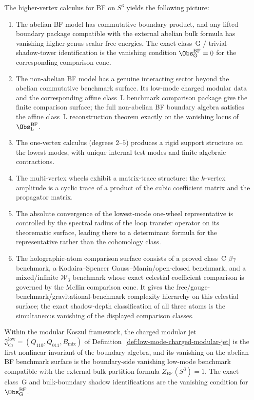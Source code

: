\begin{remark}
The higher-vertex calculus for BF on $S^3$ yields the following picture:
\begin{enumerate}[label=\textup{(\arabic*)}]
\item The abelian BF model has commutative boundary product, and any
 lifted boundary package compatible with the external abelian bulk formula has
 vanishing higher-genus scalar free energies. The exact class~G /
 trivial-shadow-tower identification is the vanishing condition
 $\Obs^{\mathrm{BF}}_{\mathrm{G}}=0$ for the corresponding comparison cone.
\item The non-abelian BF model has a genuine interacting sector beyond the abelian
 commutative benchmark surface. Its low-mode charged modular data and the
 corresponding affine class~L benchmark comparison package give the finite
 comparison surface; the
 full non-abelian BF boundary algebra satisfies the affine class~L reconstruction
 theorem exactly on the vanishing locus of
 $\Obs^{\mathrm{BF}}_{\mathrm{L}}$.
\item The one-vertex calculus (degrees $2$--$5$) produces a rigid support structure on
 the lowest modes, with unique internal test modes and finite algebraic contractions.
\item The multi-vertex wheels exhibit a matrix-trace structure: the $k$-vertex amplitude
 is a cyclic trace of a product of the cubic coefficient matrix and the propagator matrix.
\item The absolute convergence of the lowest-mode one-wheel representative is controlled
 by the spectral radius of the loop transfer operator on its theorematic surface,
 leading there to a determinant formula for the representative rather than the
 cohomology class.
\item The holographic-atom comparison surface consists of a proved class~C
 $\beta\gamma$ benchmark, a Kodaira--Spencer Gauss--Manin/open-closed benchmark,
 and a mixed/infinite $\mathcal{W}_3$ benchmark whose exact celestial
 coefficient comparison is governed by the Mellin comparison cone. It gives the
 free/gauge-benchmark/gravitational-benchmark complexity hierarchy on this
 celestial surface; the exact shadow-depth classification of all three atoms is
 the simultaneous vanishing of the displayed comparison classes.
\end{enumerate}
Within the modular Koszul framework, the charged modular jet
$\mathfrak{J}^{\mathrm{low}}_{\mathrm{ch}} =
(Q_{110}, Q_{011}, B_{\mathrm{mix}})$ of Definition~\ref{def:low-mode-charged-modular-jet}
is the first nonlinear invariant of the boundary algebra, and its vanishing on the
abelian BF benchmark surface is the
boundary-side vanishing low-mode benchmark compatible with the external bulk
partition formula $Z_{\mathrm{BF}}(S^3) = 1$. The exact class~G and
bulk-boundary shadow identifications are the vanishing condition for
$\Obs^{\mathrm{BF}}_{\mathrm{G}}$.
\end{remark}

